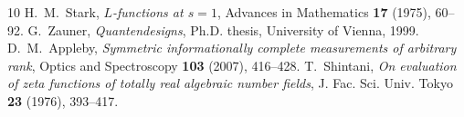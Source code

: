 \documentclass[12pt]{article}
\begin{document}

\begin{thebibliography}{10}
 H.~M.~Stark, \emph{$L$-functions at $s=1$}, Advances in Mathematics \textbf{17} (1975), 60--92.
 G.~Zauner, \emph{Quantendesigns}, Ph.D. thesis, University of Vienna, 1999.
 D.~M.~Appleby, \emph{Symmetric informationally complete measurements of arbitrary rank}, Optics and Spectroscopy \textbf{103} (2007), 416--428.
 T.~Shintani, \emph{On evaluation of zeta functions of totally real algebraic number fields}, J. Fac. Sci. Univ. Tokyo \textbf{23} (1976), 393--417.
\end{thebibliography}
\end{document}
